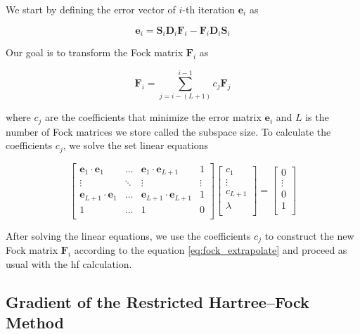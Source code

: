 We start by defining the error vector of \(i\)-th iteration \(\mathbf{e}_i\) as

\begin{equation}
\mathbf{e}_i=\mathbf{S}_i\mathbf{D}_i\mathbf{F}_i-\mathbf{F}_i\mathbf{D}_i\mathbf{S}_i
\end{equation}

Our goal is to transform the Fock matrix \(\mathbf{F}_i\) as

\begin{equation}\label{eq:fock_extrapolate}
\mathbf{F}_i=\sum_{j=i-(L+1)}^{i-1}c_j\mathbf{F}_j
\end{equation}

where \(c_j\) are the coefficients that minimize the error matrix \(\mathbf{e}_i\) and \(L\) is the number of Fock matrices we store called the subspace size. To calculate the coefficients \(c_j\), we solve the set linear equations

\begin{equation}
\begin{bmatrix}
\mathbf{e}_1\cdot\mathbf{e}_1 & \dots & \mathbf{e}_1\cdot\mathbf{e}_{L+1} & 1 \\
\vdots & \ddots & \vdots & \vdots \\
\mathbf{e}_{L+1}\cdot\mathbf{e}_1 & \dots & \mathbf{e}_{L+1}\cdot\mathbf{e}_{L+1} & 1 \\
1 & \dots & 1 & 0 \\
\end{bmatrix}
\begin{bmatrix}
c_1 \\
\vdots \\
c_{L+1} \\
\lambda \\
\end{bmatrix}
=
\begin{bmatrix}
0 \\
\vdots \\
0 \\
1 \\
\end{bmatrix}
\end{equation}

After solving the linear equations, we use the coefficients \(c_j\) to construct the new Fock matrix \(\mathbf{F}_i\) according to the equation \eqref{eq:fock_extrapolate} and proceed as usual with the \acrshort{hf} calculation.

\subsection{Gradient of the Restricted Hartree--Fock Method}

